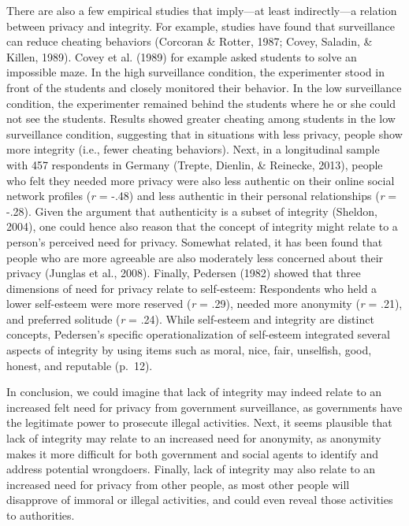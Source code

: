\documentclass[man,floatsintext]{apa6}
\begin{document}
There are also a few empirical studies that imply---at least indirectly---a relation between privacy and integrity. For example, studies have found that surveillance can reduce cheating behaviors (Corcoran \& Rotter, 1987; Covey, Saladin, \& Killen, 1989). Covey et al. (1989) for example asked students to solve an impossible maze. In the high surveillance condition, the experimenter stood in front of the students and closely monitored their behavior. In the low surveillance condition, the experimenter remained behind the students where he or she could not see the students. Results showed greater cheating among students in the low surveillance condition, suggesting that in situations with less privacy, people show more integrity (i.e., fewer cheating behaviors). Next, in a longitudinal sample with 457 respondents in Germany (Trepte, Dienlin, \& Reinecke, 2013), people who felt they needed more privacy were also less authentic on their online social network profiles (\emph{r} = -.48) and less authentic in their personal relationships (\emph{r} = -.28). Given the argument that authenticity is a subset of integrity (Sheldon, 2004), one could hence also reason that the concept of integrity might relate to a person's perceived need for privacy. Somewhat related, it has been found that people who are more agreeable are also moderately less concerned about their privacy (Junglas et al., 2008). Finally, Pedersen (1982) showed that three dimensions of need for privacy relate to self-esteem: Respondents who held a lower self-esteem were more reserved (\emph{r} = .29), needed more anonymity (\emph{r} = .21), and preferred solitude (\emph{r} = .24). While self-esteem and integrity are distinct concepts, Pedersen's specific operationalization of self-esteem integrated several aspects of integrity by using items such as moral, nice, fair, unselfish, good, honest, and reputable (p.~12).

In conclusion, we could imagine that lack of integrity may indeed relate to an increased felt need for privacy from government surveillance, as governments have the legitimate power to prosecute illegal activities. Next, it seems plausible that lack of integrity may relate to an increased need for anonymity, as anonymity makes it more difficult for both government and social agents to identify and address potential wrongdoers. Finally, lack of integrity may also relate to an increased need for privacy from other people, as most other people will disapprove of immoral or illegal activities, and could even reveal those activities to authorities.
\end{document}
